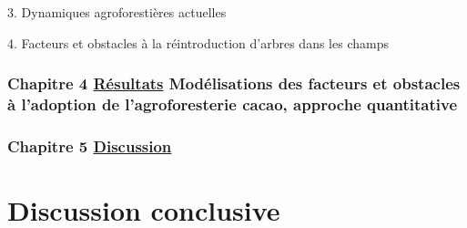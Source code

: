 \documentclass[a4paper,notitlepage]{article}
\begin{document}
3. Dynamiques agroforestières actuelles

4. Facteurs et obstacles à la réintroduction d'arbres dans les champs

\section*{Chapitre 4 \underline{Résultats} Modélisations des facteurs et obstacles à l'adoption de l'agroforesterie cacao, approche quantitative}

\section*{Chapitre 5 \underline{Discussion}}
\vspace{1cm}




\part{Discussion conclusive}
\end{document}
